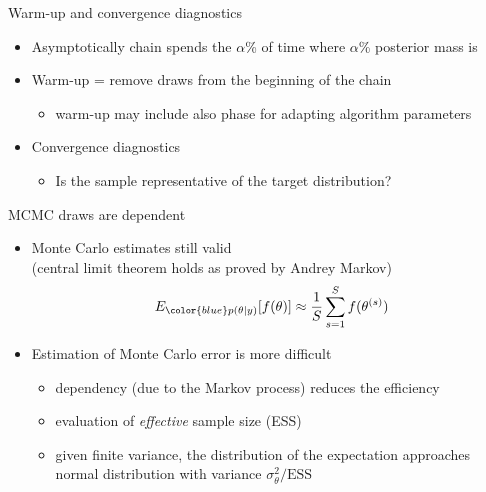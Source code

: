 \documentclass[finnish,english,t]{beamer}
\begin{document}
\begin{frame}{Warm-up and convergence diagnostics}

  \begin{itemize}
  \item Asymptotically chain spends the $\alpha$\% of time where
    $\alpha$\% posterior mass is
      \vspace{-.5\baselineskip}
    \item<3-> Warm-up = remove draws from the beginning of the chain
      \begin{itemize}
      \item warm-up may include also phase for adapting algorithm parameters
      \end{itemize}
    \item<4-> Convergence diagnostics 
      \begin{itemize}
      \item Is the sample representative of the target distribution?
      \end{itemize}
  \end{itemize}

\end{frame}

\begin{frame}{MCMC draws are dependent}

  \begin{itemize}
  \item Monte Carlo estimates still valid\\
    (central limit theorem holds as proved by Andrey Markov)
      \begin{align*}
        E_{\color{blue} p(\theta \mid y)}[f(\theta)] \approx \frac{1}{S} \sum_{s=1}^S f(\theta^{(s)})
      \end{align*}
    \item Estimation of Monte Carlo error is more difficult
      \begin{itemize}
      \item<+-> dependency (due to the Markov process) reduces the efficiency
      \item<+-> evaluation of {\it effective} sample size (ESS)
      \item<+-> given finite variance, the distribution of the expectation
        approaches normal distribution with variance
        $\sigma^2_\theta/\text{ESS}$
      \end{itemize}
    \end{itemize}  

\end{frame}
\end{document}
